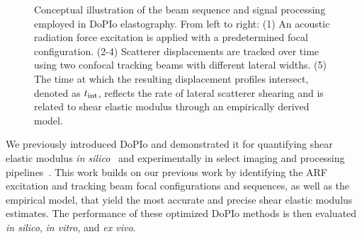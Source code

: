\begin{figure}[tbp]
    
    \caption{Conceptual illustration of the beam sequence and signal processing employed in DoPIo elastography. From left to right: (1) An acoustic radiation force excitation is applied with a predetermined focal configuration. (2-4) Scatterer displacements are tracked over time using two confocal tracking beams with different lateral widths. (5) The time at which the resulting displacement profiles intersect, denoted as $t_{\textnormal{int}}$, reflects the rate of lateral scatterer shearing and is related to shear elastic modulus through an empirically derived model.}
    \label{fig:mechanism}
\end{figure}

We previously introduced DoPIo and demonstrated it for quantifying shear elastic modulus \emph{in silico}~\cite{yokoyama_Doubleprofile_2019,yokoyama_Bessel_2023,muhtadi_Double_2025} and experimentally in select imaging and processing pipelines~\cite{yokoyama_Blind_2020,yokoyama_Assessing_2021,yokoyama_Quantitative_2022}. This work builds on our previous work by identifying the ARF excitation and tracking beam focal configurations and sequences, as well as the empirical model, that yield the most accurate and precise shear elastic modulus estimates. The performance of these optimized DoPIo methods is then evaluated \emph{in silico}, \emph{in vitro}, and \emph{ex vivo}.

